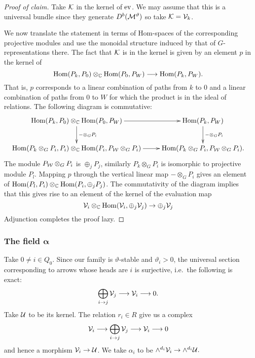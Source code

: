 \documentclass{amsart}
\newcommand{\balpha}{\boldsymbol{\alpha}}
\theoremstyle{definition}
\begin{document}
\begin{proof}[Proof of claim]
Take $\mathcal{K}$ in the kernel of $\operatorname{ev}$.
We may assume that this is a universal bundle since they generate $D^b(\mathcal{M}^\vartheta)$ so take $\mathcal{K}=\mathcal{V}_k$.

We now translate the statement in terms of Hom-spaces of the corresponding projective modules and use the monoidal structure induced by that of $G$-representations there.
The fact that $\mathcal{K}$ is in the kernel is given by an element $p$ in the kernel of 
\begin{equation}
    \operatorname{Hom}(P_k, P_0) \otimes_{\mathbb{C}} \operatorname{Hom}(P_0, P_W) \longrightarrow \operatorname{Hom}(P_k, P_W).
\end{equation}
That is, $p$ corresponds to a linear combination of paths from $k$ to $0$ and a linear combination of paths from $0$ to $W$ for which the product is in the ideal of relations.
The following diagram is commutative:
\begin{equation*}
    \xymatrix{\Hom(P_k, P_0) \otimes_\bC \Hom(P_0, P_W) \ar[r] \ar[d]^{- \otimes_G P_i} & \Hom(P_k, P_W) \ar[d]^{- \otimes_G P_i} \\
    \Hom(P_k \otimes_G P_i, P_i) \otimes_\bC \Hom(P_i, P_\cW \otimes_G P_i) \ar[r] & \Hom(P_k \otimes_G P_i, P_\cW \otimes_G P_i).}
\end{equation*}
The module $P_{\mathcal{W}} \otimes_G P_i$ is $\oplus_j P_j$, similarly $P_k \otimes_G P_i$ is isomorphic to projective module $P_l$. 
Mapping $p$ through the vertical linear map $- \otimes_G P_i$ gives an element of $\operatorname{Hom}(P_l, P_i) \otimes_{\mathbb{C}} \operatorname{Hom}(P_i, \oplus_j P_j)$.
The commutativity of the diagram implies that this gives rise to an element of the kernel of the evaluation map $$\mathcal{V}_i \otimes_{\mathbb{C}} \operatorname{Hom}(\mathcal{V}_i, \oplus_j \mathcal{V}_j) \rightarrow \oplus_j \mathcal{V}_j$$
Adjunction completes the proof {\red lazy}.
\end{proof}


\subsubsection{The field $\balpha$}\label{sssc:alpha}

Take $0 \neq i \in Q_0$.
Since our family is $\vartheta$-stable and $\vartheta_i>0$, the universal section corresponding to arrows whose heads are $i$ is surjective, i.e.\ the following is exact:
\begin{equation}\label{eq:k}
    \bigoplus_{i \rightarrow j} \mathcal{V}_j \longrightarrow \mathcal{V}_i \longrightarrow 0.
\end{equation}
Take $\mathcal{U}$ to be its kernel.
The relation $r_i \in R$ give us a complex
$$\mathcal{V}_i \longrightarrow \bigoplus_{i \rightarrow j} \mathcal{V}_j \longrightarrow \mathcal{V}_i \longrightarrow 0$$
and hence a morphism $\mathcal{V}_i \rightarrow \mathcal{U}$.
We take $\alpha_i$ to be $\wedge^{d_i} \mathcal{V}_i \rightarrow \wedge^{d_i}\mathcal{U}.$
\end{document}
